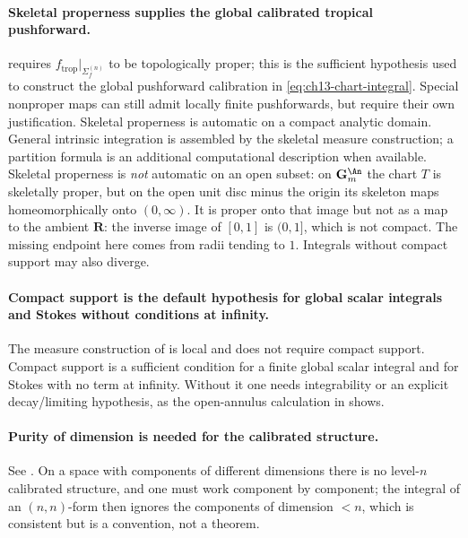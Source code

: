 \paragraph{Skeletal properness supplies the global calibrated tropical
pushforward.}
 requires
$f_{\mathrm{trop}}|_{\Sigma_f^{(n)}}$ to be topologically proper; this is
the sufficient hypothesis used to construct the
global pushforward calibration in \eqref{eq:ch13-chart-integral}.
Special nonproper maps can still admit locally finite pushforwards,
but require their own justification.  Skeletal properness is automatic on a
compact analytic domain.  General intrinsic integration is assembled
by the skeletal measure construction; a partition formula is an
additional computational description when available.  Skeletal properness
is \emph{not} automatic on an open subset: on
$\mathbf G_m^{\An}$ the chart $T$ is skeletally proper, but on the open unit
disc minus the origin its skeleton maps homeomorphically onto
$(0,\infty)$.  It is proper onto that image but not as a map to the
ambient $\mathbf R$: the inverse image of $[0,1]$ is $(0,1]$, which
is not compact.  The missing endpoint here comes from radii tending
to $1$.  Integrals without compact support may also diverge.

\paragraph{Compact support is the default hypothesis for global scalar
integrals and Stokes without conditions at infinity.}
The measure construction of  is local and
does not require compact support.  Compact support is a sufficient condition
for a finite global scalar integral and for Stokes with no term at infinity.
Without it one needs integrability or an explicit decay/limiting hypothesis,
as the open-annulus calculation in  shows.

\paragraph{Purity of dimension is needed for the calibrated structure.}
See .  On a space with components
of different dimensions there is no level-$n$ calibrated structure, and one
must work component by component; the integral of an $(n,n)$-form then
ignores the components of dimension $<n$, which is consistent but is a
convention, not a theorem.

